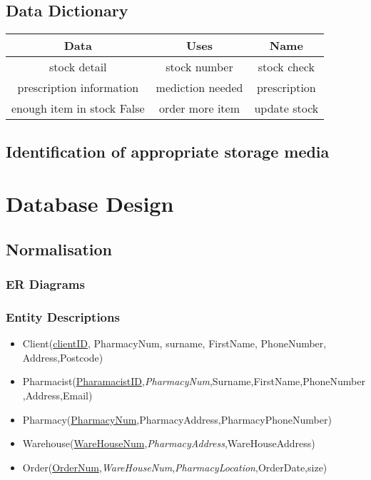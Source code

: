 \begin{itemize}
\subsection{Data Dictionary}
\begin{table}[h]
\begin{tabular}{|c|c|c|}
\hline
Data & Uses & Name \\
\hline
stock detail & stock number & stock check\\
\hline
prescription information & mediction needed & prescription\\
\hline
enough item in stock False & order more item & update stock\\
\hline
\end{tabular}
\label{table:nonlin}
\end{table}
\subsection{Identification of appropriate storage media}

\section{Database Design}

\subsection{Normalisation}

\subsubsection{ER Diagrams}

\subsubsection{Entity Descriptions}
\begin{itemize}
\item Client(\underline{clientID}, PharmacyNum, surname, FirstName, PhoneNumber, Address,Postcode)
\item Pharmacist(\underline{PharamacistID},\emph{PharmacyNum},Surname,FirstName,PhoneNumber,Address,Email)
\item Pharmacy(\underline{PharmacyNum},PharmacyAddress,PharmacyPhoneNumber)
\item Warehouse(\underline{WareHouseNum},\emph{PharmacyAddress},WareHouseAddress)
\item Order(\underline{OrderNum},\emph{WareHouseNum},\emph{PharmacyLocation},OrderDate,size)
\end{itemize}

\end{itemize}
